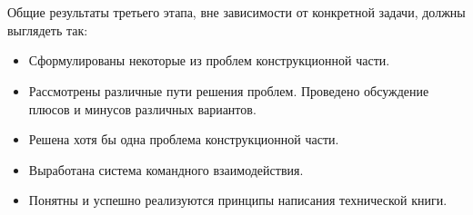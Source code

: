 {\hypertarget{lesson25x4}{}}\\\\

Общие результаты третьего этапа, вне зависимости от конкретной задачи, должны выглядеть так:

\begin{itemize}
	\item Сформулированы некоторые из проблем конструкционной части. 
	\item Рассмотрены различные пути решения проблем. Проведено обсуждение плюсов и минусов различных вариантов.
	\item Решена хотя бы одна проблема конструкционной части.
	\item Выработана система командного взаимодействия.
	\item Понятны и успешно реализуются принципы написания технической книги.		
\end{itemize}
